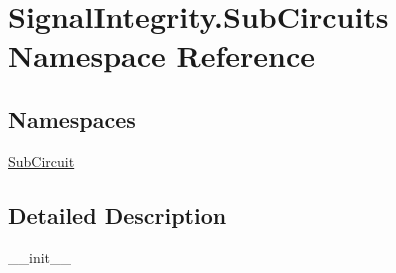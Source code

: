 \hypertarget{namespaceSignalIntegrity_1_1SubCircuits}{}\section{Signal\+Integrity.\+Sub\+Circuits Namespace Reference}
\label{namespaceSignalIntegrity_1_1SubCircuits}
\subsection*{Namespaces}
\begin{DoxyCompactItemize}
\item 
 \hyperlink{namespaceSignalIntegrity_1_1SubCircuits_1_1SubCircuit}{Sub\+Circuit}
\end{DoxyCompactItemize}


\subsection{Detailed Description}
\begin{DoxyVerb}__init__\end{DoxyVerb}
 